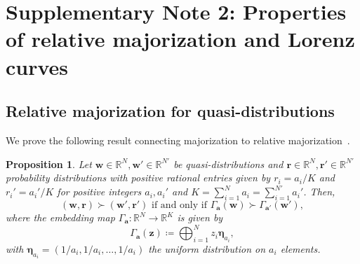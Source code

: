 \documentclass[
twocolumn,
superscriptaddress
]{revtex4-1}
\newtheorem{proposition}[theorem]{Proposition}
\def\bmeta{\boldsymbol{\eta}}
\def\bma{\boldsymbol{a}}
\def\z{\boldsymbol{z}}
\def\r{\boldsymbol{r}}
\def\w{\boldsymbol{w}}
\begin{document}
\section*{Supplementary Note 2: Properties of relative majorization and Lorenz curves}

\subsection*{Relative majorization for quasi-distributions}

We prove the following result connecting majorization to relative majorization~\cite{cit:horodecki2013, Brandao_2015,  cit:lostaglio}.
\begin{proposition}\label{relmaj2maj}
	Let $\w \in \mathbb{R}^N, \w' \in \mathbb{R}^{N'}$ be quasi-distributions and $\r \in \mathbb{R}^N, \r' \in \mathbb{R}^{N'}$ probability distributions with positive rational entries given by $r_i = a_i/K$ and $r_i' = a_i'/K$ for positive integers $a_i, a_i'$ and $K = \sum_{i=1}^N a_i = \sum_{i=1}^{N'} a_i'$. 
Then,
\begin{equation}
(\w, \r) \succ (\w', \r') \mbox{ if and only if } \Gamma_{\bma} (\w) \succ \Gamma_{\bma'} (\w'),
\end{equation}
where the embedding map $\Gamma_{\bma} :\mathbb{R}^N \rightarrow \mathbb{R}^K$ is given by
\begin{equation}
	\Gamma_{\bma}(\z) \coloneqq \bigoplus_{i=1}^N z_i \bmeta_{a_i},
\end{equation}
with $\bmeta_{a_i} = (1/a_i, 1/a_i, \dots, 1/a_i)$ the uniform distribution on $a_i$ elements.
\end{proposition}
\end{document}
